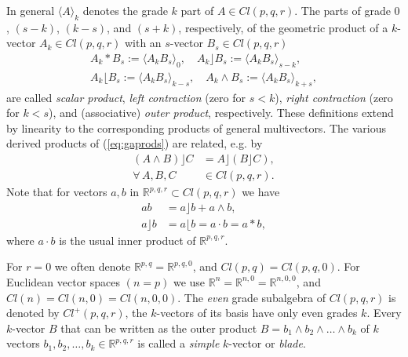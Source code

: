 \documentclass[cameraready]{jcmsi}%
\newcommand{\R}{\mathbb{R}}
\begin{document}
In general $\langle A \rangle_{k}$ denotes the grade $k$ part of $A\in Cl(p,q,r)$. The parts of grade $0$, $(s-k)$, $(k-s)$, and $(s+k)$, respectively, of the geometric product of a $k$-vector $A_k\in Cl(p,q,r)$ with an $s$-vector $B_s\in Cl(p,q,r)$ 
\begin{gather}
  \label{eq:gaprods}
  A_k \ast B_s := \langle A_k B_s \rangle_{0}, \quad
  A_k \rfloor B_s := \langle A_k B_s \rangle_{s-k}, 
  \\
  A_k \lfloor B_s := \langle A_k B_s \rangle_{k-s}, \quad
  A_k \wedge B_s := \langle A_k B_s \rangle_{k+s},
\nonumber
\end{gather}
are called \textit{scalar product}, \textit{left contraction} (zero for $s<k$), \textit{right contraction} (zero for $k<s$), and (associative) \textit{outer product}, respectively. These definitions extend by linearity to the corresponding products of general multivectors. The various derived products of (\ref{eq:gaprods}) are related, e.g. by
\begin{align} 
  (A\wedge B)\rfloor C &= A\rfloor (B\rfloor C),
  \nonumber \\
  \forall\, A,B,C &\in Cl(p,q,r).
  \label{eq:ABCrel}
\end{align} 
Note that for vectors $a,b$ in $\R^{p,q,r} \subset Cl(p,q,r)$ we have
\begin{align} 
  ab &= a \rfloor b + a \wedge b, 
  \nonumber \\
  a \rfloor b &= a \lfloor b = a \cdot b = a \ast b,
\end{align} 
where $a \cdot b$ is the usual inner product of $\R^{p,q,r}$. 

For $r=0$ we often denote $\R^{p,q}=\R^{p,q,0}$, and $Cl(p,q) = Cl(p,q,0)$. For Euclidean vector spaces $(n=p)$ we use $\R^{n}=\R^{n,0}=\R^{n,0,0}$, and $Cl(n) = Cl(n,0) = Cl(n,0,0)$. The \textit{even} grade subalgebra of $Cl(p,q,r)$ is denoted by $Cl^+(p,q,r)$, the $k$-vectors of its basis have only even grades $k$. Every $k$-vector $B$ that can be written as the outer product $B = b_1 \wedge b_2 \wedge \ldots \wedge b_k$ of $k$ vectors $b_1, b_2, \ldots, b_k \in \R^{p,q,r}$ is called a \textit{simple} $k$-vector or \textit{blade}. 
\end{document}
